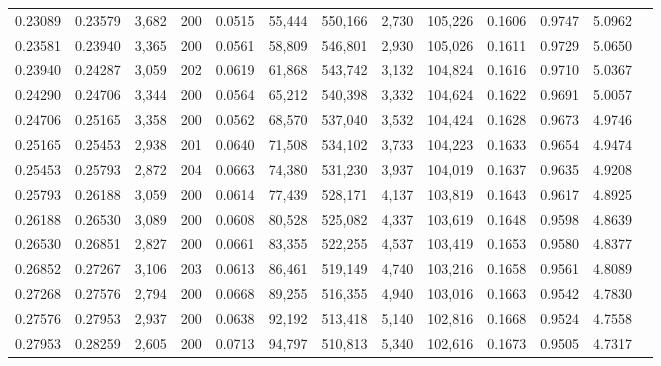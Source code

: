 \begin{tabular}{rrrrrrrrrrrrr}
0.23089 & 0.23579 & 3,682 & 200 &                                     0.0515 &  55,444 & 550,166 &   2,730 & 105,226 & 0.1606 & 0.9747 & 5.0962 \\
0.23581 & 0.23940 & 3,365 & 200 &                                     0.0561 &  58,809 & 546,801 &   2,930 & 105,026 & 0.1611 & 0.9729 & 5.0650 \\
0.23940 & 0.24287 & 3,059 & 202 &                                     0.0619 &  61,868 & 543,742 &   3,132 & 104,824 & 0.1616 & 0.9710 & 5.0367 \\
0.24290 & 0.24706 & 3,344 & 200 &                                     0.0564 &  65,212 & 540,398 &   3,332 & 104,624 & 0.1622 & 0.9691 & 5.0057 \\
0.24706 & 0.25165 & 3,358 & 200 &                                     0.0562 &  68,570 & 537,040 &   3,532 & 104,424 & 0.1628 & 0.9673 & 4.9746 \\
0.25165 & 0.25453 & 2,938 & 201 &                                     0.0640 &  71,508 & 534,102 &   3,733 & 104,223 & 0.1633 & 0.9654 & 4.9474 \\
0.25453 & 0.25793 & 2,872 & 204 &                                     0.0663 &  74,380 & 531,230 &   3,937 & 104,019 & 0.1637 & 0.9635 & 4.9208 \\
0.25793 & 0.26188 & 3,059 & 200 &                                     0.0614 &  77,439 & 528,171 &   4,137 & 103,819 & 0.1643 & 0.9617 & 4.8925 \\
0.26188 & 0.26530 & 3,089 & 200 &                                     0.0608 &  80,528 & 525,082 &   4,337 & 103,619 & 0.1648 & 0.9598 & 4.8639 \\
0.26530 & 0.26851 & 2,827 & 200 &                                     0.0661 &  83,355 & 522,255 &   4,537 & 103,419 & 0.1653 & 0.9580 & 4.8377 \\
0.26852 & 0.27267 & 3,106 & 203 &                                     0.0613 &  86,461 & 519,149 &   4,740 & 103,216 & 0.1658 & 0.9561 & 4.8089 \\
0.27268 & 0.27576 & 2,794 & 200 &                                     0.0668 &  89,255 & 516,355 &   4,940 & 103,016 & 0.1663 & 0.9542 & 4.7830 \\
0.27576 & 0.27953 & 2,937 & 200 &                                     0.0638 &  92,192 & 513,418 &   5,140 & 102,816 & 0.1668 & 0.9524 & 4.7558 \\
0.27953 & 0.28259 & 2,605 & 200 &                                     0.0713 &  94,797 & 510,813 &   5,340 & 102,616 & 0.1673 & 0.9505 & 4.7317 \\

\end{tabular}
